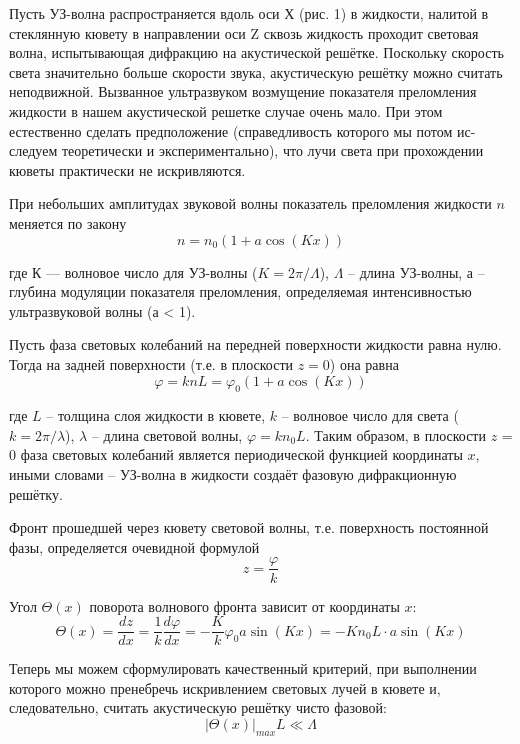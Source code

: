 \documentclass[14pt]{article}
\begin{document}
Пусть УЗ-волна распространяется вдоль оси Х (рис. 1) в жидкости, налитой в стеклянную кювету в направлении оси Z сквозь жидкость проходит световая волна, испытывающая дифракцию на акустической решётке. Поскольку скорость света значительно больше скорости звука, акустическую решётку можно считать неподвижной. Вызванное ультразвуком возмущение показателя преломления жидкости в нашем акустической решетке случае очень мало. При этом естественно сделать предположение (справедливость которого мы потом ис-
следуем теоретически и экспериментально), что лучи света при прохождении кюветы практически не искривляются.

При небольших амплитудах звуковой волны показатель преломления
жидкости $n$ меняется по закону
\begin{equation}
	n = n_0(1 + a\cos(Kx))
\end{equation}

где К — волновое число для УЗ-волны ($K = 2\pi/\Lambda$), $\Lambda$ -- длина УЗ-волны, а -- глубина модуляции показателя преломления, определяемая интенсивностью ультразвуковой волны (а < 1).

Пусть фаза световых колебаний на передней поверхности жидкости равна нулю. Тогда на задней поверхности (т.е. в плоскости $z = 0$) она равна
\begin{equation}
	\varphi = knL = \varphi_0(1 + a\cos(Kx))
\end{equation}

где $L$ -- толщина слоя жидкости в кювете, $k$ -- волновое число для света ($k = 2\pi/\lambda$), $\lambda$ -- длина световой волны, $\varphi = kn_0L$. Таким образом, в плоскости $z$ = 0 фаза световых колебаний является периодической функцией координаты $x$, иными словами -- УЗ-волна в жидкости создаёт фазовую дифракционную решётку.

Фронт прошедшей через кювету световой волны, т.е. поверхность постоянной фазы, определяется очевидной формулой
\begin{equation}
	z = \frac{\varphi}{k}
\end{equation}

Угол $\Theta(x)$ поворота волнового фронта зависит от координаты $x$:
\begin{equation}
	\Theta(x) = \frac{dz}{dx} = \frac{1}{k}\frac{d\varphi}{dx} = -\frac{K}{k}\varphi_0a\sin(Kx) = -Kn_0L\cdot a\sin(Kx)
\end{equation}

Теперь мы можем сформулировать качественный критерий, при выполнении которого можно пренебречь искривлением световых лучей в кювете и, следовательно, считать акустическую решётку чисто фазовой:
\begin{equation}
	|\Theta(x)|_{max}L \ll \Lambda
\end{equation}
\end{document}
